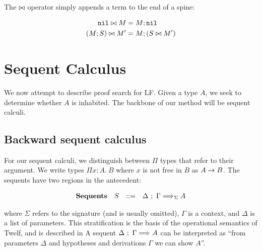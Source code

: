 \documentclass[11pt,twoside]{article}
\begin{document}
The $\bowtie$ operator simply appends a term to the end of a spine:

\bigskip 
{}

\begin{align*} 
\mathtt{nil}\bowtie M &= M;\mathtt{nil}\\
(M;S)\bowtie M' &= M;(S\bowtie M')
\end{align*} 






\section{Sequent Calculus}

We now attempt to describe proof search for LF.
Given a type $A$, we seek to determine whether $A$ 
is inhabited. The backbone of our method will be sequent calculi.

\renewcommand{\PiTyp}[3]{\Pi #1 : #2.\ #3}
\renewcommand{\Lam}[2]{\lambda #1.\ #2}


\subsection{Backward sequent calculus}
For our sequent calculi, we distinguish between $\Pi$ types
that refer to their argument.  We write types 
$\PiTyp{x}{A}{B}$ where $x$ is not free in $B$ as
$A \to B$.  The sequents have two regions in the antecedent:

\newcommand{\Sequent}[4][]{#2\ ;\ #3 \SeqArr_{#1} #4}

$$
\begin{array}{llll}
\mathbf{Sequents} & S & ::= & \Sequent[\Sigma]{\Delta}{\Gamma}{A} \\
\end{array} 
$$

\noindent 
where $\Sigma$ refers to the signature (and is usually omitted),
$\Gamma$ is a context, and $\Delta$ is a list of parameters.   
This stratification is the basis of the operational semantics
of Twelf, and is described in 
A sequent $\Sequent{\Delta}{\Gamma}{A}$
can be interpreted as ``from parameters $\Delta$ and hypotheses 
and derivations $\Gamma$ we can show $A$''.  
\end{document}
